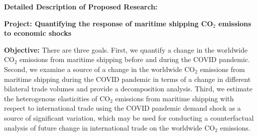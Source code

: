 \documentclass[hidelinks, 12pt,letterpaper]{article}
\begin{document}




\begin{center}
\textbf{Detailed Description of Proposed Research: }\vspace{-0.25cm}
\end{center}

\noindent \textbf{Project: Quantifying the response of maritime shipping CO$_2$ emissions to economic shocks}
\smallskip

\noindent \textbf{Objective:} There are three goals. First, we quantify a change in the worldwide CO$_2$ emissions from maritime shipping before and during the COVID pandemic. Second, we examine a source of a change in the worldwide CO$_2$ emissions from maritime shipping during the COVID pandemic in terms of a change in different bilateral trade volumes and provide a decomposition analysis. 
Third, we estimate the heterogenous elasticities of CO$_2$ emissions from maritime shipping with respect to international trade using the COVID pandemic demand shock as a source of significant variation, which may be used for conducting a counterfactual analysis of future change in international trade on the worldwide CO$_2$ emissions.   \smallskip
\end{document}
